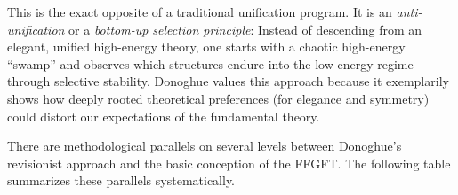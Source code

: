 	This is the exact opposite of a traditional unification program. It is an \emph{anti-unification} or a \emph{bottom-up selection principle}: Instead of descending from an elegant, unified high-energy theory, one starts with a chaotic high-energy ``swamp'' and observes which structures endure into the low-energy regime through selective stability. Donoghue values this approach because it exemplarily shows how deeply rooted theoretical preferences (for elegance and symmetry) could distort our expectations of the fundamental theory.
	
	
	There are methodological parallels on several levels between Donoghue's revisionist approach and the basic conception of the FFGFT. The following table summarizes these parallels systematically.
	

